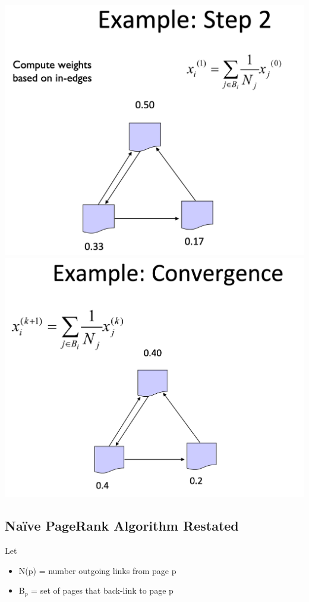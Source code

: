 \documentclass[11pt]{article}
\theoremstyle{definition}
\begin{document}
\includegraphics[width=\textwidth/2]{31.png}
\includegraphics[width=\textwidth/2]{32.png}

\subsection{Naïve PageRank Algorithm Restated}
Let

\begin{itemize}
    \item N(p) = number outgoing links from page p
    \item B$_p$ = set of pages that back-link to page p
\end{itemize}
\end{document}
